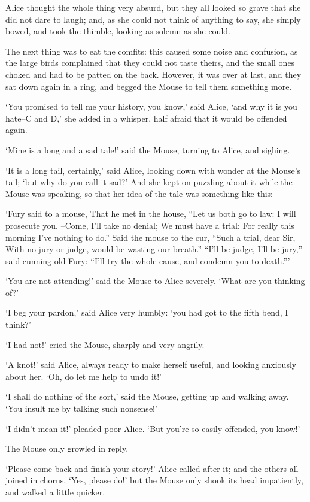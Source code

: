 \documentclass[statementpaper,twoside,openany]{memoir}
\begin{document}
Alice thought the whole thing very absurd, but they all looked so grave that she did not dare to laugh; and, as she could not think of anything to say, she simply bowed, and took the thimble, looking as solemn as she could.

The next thing was to eat the comfits: this caused some noise and confusion, as the large birds complained that they could not taste theirs, and the small ones choked and had to be patted on the back. However, it was over at last, and they sat down again in a ring, and begged the Mouse to tell them something more.

`You promised to tell me your history, you know,' said Alice, `and why it is you hate--C and D,' she added in a whisper, half afraid that it would be offended again.

`Mine is a long and a sad tale!' said the Mouse, turning to Alice, and sighing.

`It is a long tail, certainly,' said Alice, looking down with wonder at the Mouse's tail; `but why do you call it sad?' And she kept on puzzling about it while the Mouse was speaking, so that her idea of the tale was something like this:--

`Fury said to a mouse, That he met in the house, ``Let us both go to law: I will prosecute you. --Come, I'll take no denial; We must have a trial: For really this morning I've nothing to do.'' Said the mouse to the cur, ``Such a trial, dear Sir, With no jury or judge, would be wasting our breath.'' ``I'll be judge, I'll be jury,'' said cunning old Fury: ``I'll try the whole cause, and condemn you to death.'''

`You are not attending!' said the Mouse to Alice severely. `What are you thinking of?'

`I beg your pardon,' said Alice very humbly: `you had got to the fifth bend, I think?'

`I had not!' cried the Mouse, sharply and very angrily.

`A knot!' said Alice, always ready to make herself useful, and looking anxiously about her. `Oh, do let me help to undo it!'

`I shall do nothing of the sort,' said the Mouse, getting up and walking away. `You insult me by talking such nonsense!'

`I didn't mean it!' pleaded poor Alice. `But you're so easily offended, you know!'

The Mouse only growled in reply.

`Please come back and finish your story!' Alice called after it; and the others all joined in chorus, `Yes, please do!' but the Mouse only shook its head impatiently, and walked a little quicker.
\end{document}
